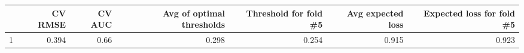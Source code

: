 
\begin{tabular}{lrrrrrr}
\toprule
  & CV RMSE & CV AUC & Avg of optimal thresholds & Threshold for fold \#5 & Avg expected loss & Expected loss for fold \#5\\
\midrule
1 & 0.394 & 0.66 & 0.298 & 0.254 & 0.915 & 0.923\\
\bottomrule
\end{tabular}